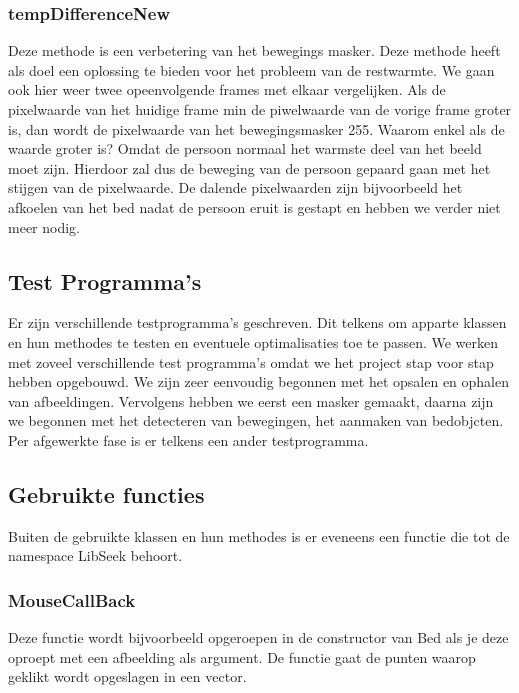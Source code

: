  \subsubsection{tempDifferenceNew}
 Deze methode is een verbetering van het bewegings masker. Deze methode heeft als doel een oplossing te bieden voor het probleem van de restwarmte. We gaan ook hier weer twee opeenvolgende frames met elkaar vergelijken. Als de pixelwaarde van het huidige frame min de piwelwaarde van de vorige frame groter is, dan wordt de pixelwaarde van het bewegingsmasker 255. Waarom enkel als de waarde groter is? Omdat de persoon normaal het warmste deel van het beeld moet zijn. Hierdoor zal dus de beweging van de persoon gepaard gaan met het stijgen van de pixelwaarde. De dalende pixelwaarden zijn bijvoorbeeld het afkoelen van het bed nadat de persoon eruit is gestapt en hebben we verder niet meer nodig. 

\subsection{Test Programma's}
\label{mRefTPr}
Er zijn verschillende testprogramma's geschreven. Dit telkens om apparte klassen en hun methodes te testen en eventuele optimalisaties toe te passen. We werken met zoveel verschillende test programma's omdat we het project stap voor stap hebben opgebouwd. We zijn zeer eenvoudig begonnen met het opsalen en ophalen van afbeeldingen. Vervolgens hebben we eerst een masker gemaakt, daarna zijn we begonnen met het detecteren van bewegingen, het aanmaken van bedobjcten. Per afgewerkte fase is er telkens een ander testprogramma.

\subsection{Gebruikte functies}
\label{MRefGFu}
Buiten de gebruikte klassen en hun methodes is er eveneens een functie die tot de namespace LibSeek behoort.

\subsubsection{MouseCallBack}
Deze functie wordt bijvoorbeeld opgeroepen in de constructor van Bed als je deze oproept met een afbeelding als argument. De functie gaat de punten waarop geklikt wordt opgeslagen in een vector. 